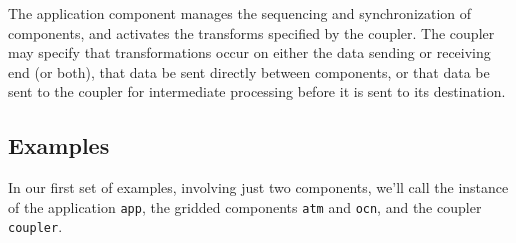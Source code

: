 The application component manages the sequencing and synchronization of
components, and activates the transforms specified by the coupler.  The
coupler may specify that transformations occur on either the data sending 
or receiving end (or both), that data be sent directly between components,
or that data be sent to the coupler for intermediate processing before 
it is sent to its destination.

\subsection{Examples}

In our first set of examples, involving just two components, we'll call 
the instance of the application {\tt app}, the gridded components {\tt atm} 
and {\tt ocn}, and the coupler {\tt coupler}.










